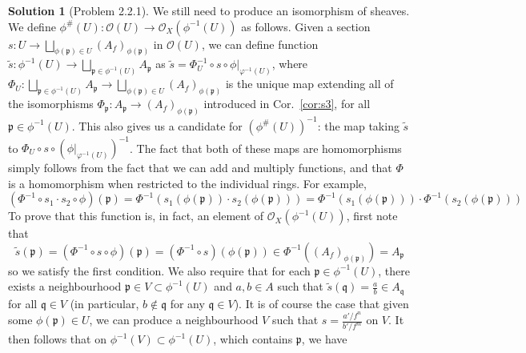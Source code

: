 \documentclass[aps,pra,showpacs,notitlepage,onecolumn,superscriptaddress,nofootinbib]{revtex4-1}
\theoremstyle{definition}
\newtheorem{solution}{Solution}[section]
\begin{document}
\begin{solution}[Problem 2.2.1]
  \noindent We still need to produce an isomorphism of sheaves. We define $\phi^{\#}(U) : \mathcal{O}(U) \rightarrow \mathcal{O}_X(\phi^{-1}(U))$ as follows. Given a section
  $s : U \rightarrow \bigsqcup_{\phi(\mathfrak{p}) \in U} (A_f)_{\phi(\mathfrak{p})}$ in $\mathcal{O}(U)$, we can define function $\widetilde{s} : \phi^{-1}(U) \rightarrow \bigsqcup_{\mathfrak{p} \in \phi^{-1}(U)} A_{\mathfrak{p}}$
  as $\widetilde{s} = \Phi^{-1}_U \circ s \circ \phi|_{\varphi^{-1}(U)}$, where $\Phi_U : \bigsqcup_{\mathfrak{p} \in \phi^{-1}(U)} A_{\mathfrak{p}} \rightarrow \bigsqcup_{\phi(\mathfrak{p}) \in U} (A_f)_{\phi(\mathfrak{p})}$ is the unique map extending all of the isomorphisms
  $\Phi_{\mathfrak{p}} :  A_{\mathfrak{p}} \rightarrow (A_f)_{\phi(\mathfrak{p})}$ introduced in Cor.~\ref{cor:s3}, for all $\mathfrak{p} \in \phi^{-1}(U)$.
  This also gives us a candidate for $(\phi^{\#}(U))^{-1}$: the map taking $\widetilde{s}$ to $\Phi_U \circ s \circ (\phi|_{\varphi^{-1}(U)})^{-1}$.
  The fact that both of these maps are homomorphisms simply follows from the fact that we can add and multiply functions, and that $\Phi$ is a homomorphism when restricted to the individual rings. For example,
  \begin{equation}
    (\Phi^{-1} \circ s_1 \cdot s_2 \circ \phi)(\mathfrak{p}) = \Phi^{-1}(s_1(\phi(\mathfrak{p})) \cdot s_2(\phi(\mathfrak{p}))) = \Phi^{-1}(s_1(\phi(\mathfrak{p}))) \cdot \Phi^{-1}(s_2(\phi(\mathfrak{p})))
    \end{equation}
  To prove that this function is, in fact, an element of $\mathcal{O}_X(\phi^{-1}(U))$, first note that
  \begin{equation}
    \widetilde{s}(\mathfrak{p}) = (\Phi^{-1} \circ s \circ \phi)(\mathfrak{p}) = (\Phi^{-1} \circ s)(\phi(\mathfrak{p})) \in \Phi^{-1}((A_f)_{\phi(\mathfrak{p})}) = A_{\mathfrak{p}}
  \end{equation}
  so we satisfy the first condition. We also require that for each $\mathfrak{p} \in \phi^{-1}(U)$, there exists a neighbourhood $\mathfrak{p} \in V \subset \phi^{-1}(U)$ and $a, b \in A$ such
  that $\widetilde{s}(\mathfrak{q}) = \frac{a}{b} \in A_{\mathfrak{q}}$ for all $\mathfrak{q} \in V$ (in particular, $b \notin \mathfrak{q}$ for any $\mathfrak{q} \in V$).  It is of course the case
  that given some $\phi(\mathfrak{p}) \in U$, we can produce a neighbourhood $V$ such that $s = \frac{a'/f^n}{b'/f^m}$ on $V$. It then follows that on $\phi^{-1}(V) \subset \phi^{-1}(U)$, which
  contains $\mathfrak{p}$, we have
  \begin{equation}

\end{equation}
\end{solution}
\end{document}
